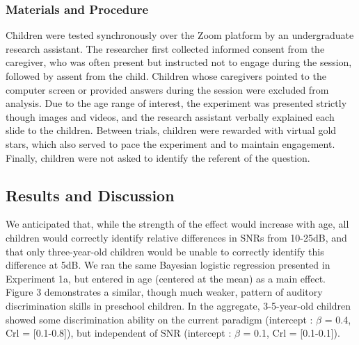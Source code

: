 \documentclass[10pt, letterpaper]{article}
\begin{document}
\hypertarget{materials-and-procedure-1}{%
\subsubsection{Materials and
Procedure}\label{materials-and-procedure-1}}

Children were tested synchronously over the Zoom platform by an
undergraduate research assistant. The researcher first collected
informed consent from the caregiver, who was often present but
instructed not to engage during the session, followed by assent from the
child. Children whose caregivers pointed to the computer screen or
provided answers during the session were excluded from analysis. Due to
the age range of interest, the experiment was presented strictly though
images and videos, and the research assistant verbally explained each
slide to the children. Between trials, children were rewarded with
virtual gold stars, which also served to pace the experiment and to
maintain engagement. Finally, children were not asked to identify the
referent of the question.

\hypertarget{results-and-discussion-1}{%
\subsection{\texorpdfstring{\textbf{Results and
Discussion}}{Results and Discussion}}\label{results-and-discussion-1}}

We anticipated that, while the strength of the effect would increase
with age, all children would correctly identify relative differences in
SNRs from 10-25dB, and that only three-year-old children would be unable
to correctly identify this difference at 5dB. We ran the same Bayesian
logistic regression presented in Experiment 1a, but entered in age
(centered at the mean) as a main effect. Figure 3 demonstrates a
similar, though much weaker, pattern of auditory discrimination skills
in preschool children. In the aggregate, 3-5-year-old children showed
some discrimination ability on the current paradigm (intercept :
\(\beta\) = 0.4, Crl = {[}0.1-0.8{]}), but independent of SNR (intercept
: \(\beta\) = 0.1, Crl = {[}0.1-0.1{]}).
\end{document}
